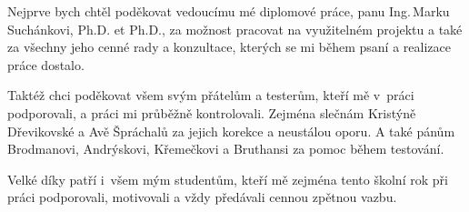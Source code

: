 \documentclass[czech,master,unicode,twoside]{ctufit-thesis}
\begin{document}
 
\frontmatter\frontmatterinit %
\thispagestyle{empty}\maketitle\thispagestyle{empty}\cleardoublepage %


\imprintpage %
\stopTOCentries

\begin{acknowledgmentpage}
    Nejprve bych chtěl poděkovat vedoucímu mé diplomové práce, panu Ing.\,Marku Suchánkovi, Ph.D. et Ph.D., za možnost pracovat na využitelném projektu a také za všechny jeho cenné rady a konzultace, kterých se mi během psaní a realizace práce dostalo.

    \vspace{1em}
    
    Taktéž chci poděkovat všem svým přátelům a testerům, kteří mě v~práci podporovali, a práci mi průběžně kontrolovali. Zejména slečnám Kristýně Dřevikovské a Avě Špráchalů
    za jejich korekce a neustálou oporu. A také pánům
    Brodmanovi,
    Andrýskovi,
    Křemečkovi
    a
    Bruthansi 
    za pomoc během testování.

    \vspace{1em}

    Velké díky patří i~všem mým studentům, kteří mě zejména tento školní rok při práci podporovali, motivovali a vždy předávali cennou zpětnou vazbu. 
\end{acknowledgmentpage} 
\end{document}
